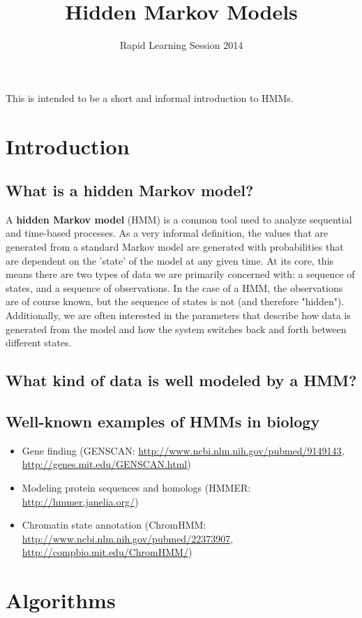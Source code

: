 \documentclass[11pt, oneside]{article}
\title{Hidden Markov Models}
\date{Rapid Learning Session 2014}
\begin{document}
\maketitle

This is intended to be a short and informal introduction to HMMs.

\section{Introduction}
\subsection{What is a hidden Markov model?}
A \textbf{hidden Markov model} (HMM) is a common tool used to analyze sequential and time-based processes. As a very informal definition, the values that are generated from a standard Markov model are generated with probabilities that are dependent on the 'state' of the model at any given time. At its core, this means there are two types of data we are primarily concerned with: a sequence of states, and a sequence of observations. In the case of a HMM, the observations are of course known, but the sequence of states is not (and therefore "hidden"). Additionally, we are often interested in the parameters that describe how data is generated from the model and how the system switches back and forth between different states.

\subsection{What kind of data is well modeled by a HMM?}
\subsection{Well-known examples of HMMs in biology}

\begin{itemize}
\item Gene finding (GENSCAN: \url{http://www.ncbi.nlm.nih.gov/pubmed/9149143}, \url{http://genes.mit.edu/GENSCAN.html})
\item Modeling protein sequences and homologs (HMMER: \url{http://hmmer.janelia.org/})
\item Chromatin state annotation (ChromHMM: \url{http://www.ncbi.nlm.nih.gov/pubmed/22373907}, \url{http://compbio.mit.edu/ChromHMM/})
\end{itemize}

\section{Algorithms}
\end{document}
